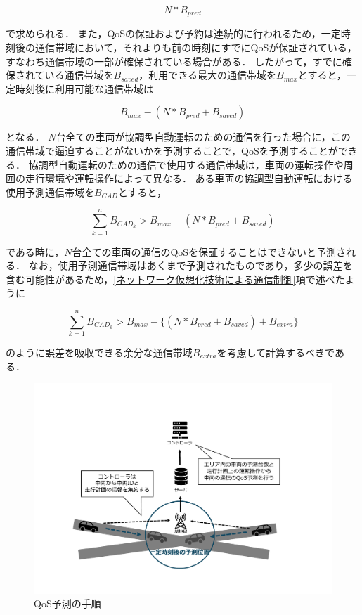 \documentclass[a4paper,11pt,uplatex]{ujreport}
\begin{document}
\begin{equation}
N * B_{pred}
\end{equation}

で求められる．
また，QoSの保証および予約は連続的に行われるため，一定時刻後の通信帯域において，それよりも前の時刻にすでにQoSが保証されている，すなわち通信帯域の一部が確保されている場合がある．
したがって，すでに確保されている通信帯域を$B_{saved}$，利用できる最大の通信帯域を$B_{max}$とすると，一定時刻後に利用可能な通信帯域は

\begin{equation}
B_{max} - (N * B_{pred} + B_{saved})
\end{equation}

となる．
$N$台全ての車両が協調型自動運転のための通信を行った場合に，この通信帯域で逼迫することがないかを予測することで，QoSを予測することができる．
協調型自動運転のための通信で使用する通信帯域は，車両の運転操作や周囲の走行環境や運転操作によって異なる．
ある車両の協調型自動運転における使用予測通信帯域を$B_{CAD}$とすると，

\begin{equation}
\sum_{k=1}^{n} B_{CAD_k} > B_{max} - (N * B_{pred} + B_{saved})
\end{equation}

である時に，$N$台全ての車両の通信のQoSを保証することはできないと予測される．
なお，使用予測通信帯域はあくまで予測されたものであり，多少の誤差を含む可能性があるため，\ref{ネットワーク仮想化技術による通信制御}項で述べたように

\begin{equation}
\sum_{k=1}^{n} B_{CAD_k} > B_{max} - \{(N * B_{pred} + B_{saved}) + B_{extra}\}
\end{equation}

のように誤差を吸収できる余分な通信帯域$B_{extra}$を考慮して計算するべきである．

\begin{figure}[tb]
  \centering
  \includegraphics[width=\linewidth]{img/QoS予測の手順.pdf}
  \caption{QoS予測の手順}
  \label{fig:QoSPrediction}
\end{figure}
\end{document}
